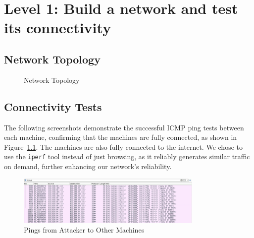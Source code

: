 \chapter{Level 1: Build a network and test its connectivity}

\section{Network Topology}

\begin{figure}[H]
    \centering
    \caption{Network Topology}\label{fig:NetworkTopology}
\end{figure}

\section{Connectivity Tests}

The following screenshots demonstrate the successful ICMP ping tests between each machine, confirming that the machines are fully connected, as shown in Figure~\ref{fig:NetworkTopology}. The machines are also fully connected to the internet. We chose to use the \texttt{iperf} tool instead of just browsing, as it reliably generates similar traffic on demand, further enhancing our network's reliability.

\begin{figure}[H]
    \centering
    \includegraphics[width=0.8\textwidth]{img/level1/level1-192-168-96-110.png}
    \caption{Pings from Attacker to Other Machines}\label{fig:PingAttacker}
\end{figure}

